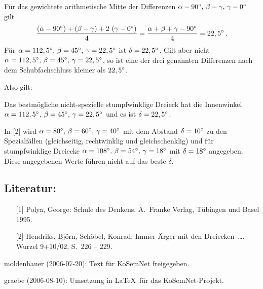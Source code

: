 \documentclass[10pt]{article}
\begin{document}
Für das gewichtete arithmetische Mitte der Differenzen $\alpha-90^{\circ},\,
\beta-\gamma,\, \gamma-0^{\circ}$ gilt
\begin{gather*}
  \frac{\left(\alpha-90^{\circ}\right)+\left(\beta-\gamma\right)+2\,\left(\gamma-0^{\circ}\right)}{4} =
  \frac{\alpha+\beta+\gamma-90^{\circ}}{4}=22,5^{\circ}\,. 
\end{gather*}
Für $\alpha=112,5^{\circ},\, \beta=45^{\circ},\, \gamma=22,5^{\circ}$ ist
$\delta=22,5^{\circ}$.  Gilt aber nicht $\alpha=112,5^{\circ},\, \beta=45^{\circ},\,
\gamma=22,5^{\circ}$, so ist eine der drei genannten Differenzen nach dem
Schubfachschluss kleiner als $22,5^{\circ}$.

Also gilt:
\begin{satz}
  Das bestmögliche nicht-spezielle stumpfwinklige Dreieck hat die Innenwinkel
  $\alpha=112,5^{\circ}$, $\beta=45^{\circ},\, \gamma=22,5^{\circ}$ und es ist
  $\delta=22,5^{\circ}$.
\end{satz}

In [2] wird $\alpha=80^{\circ},\, \beta=60^{\circ},\, \gamma=40^{\circ}$ mit dem
Abstand $\delta=10^{\circ}$ zu den Spezialfällen (gleichseitig, rechtwinklig und
gleichschenklig) und für stumpfwinklige Dreiecke $\alpha=108^{\circ},\,
\beta=54^{\circ},\, \gamma=18^{\circ}$ mit $\delta=18^{\circ}$ angegeben. Diese
angegebenen Werte führen nicht auf das beste $\delta$.

\subsection*{Literatur:}
\begin{itemize}
\item[{[1]}] Polya, George: Schule des Denkens. A.~Franke Verlag, Tübingen und
  Basel 1995.
\item[{[2]}] Hendriks, Björn, Schöbel, Konrad: Immer Ärger mit den Dreiecken\
  \ldots. Wurzel 9+10/02, S.~226 -- 229. 
\end{itemize}


\begin{attribution}
moldenhauer (2006-07-20): Text für KoSemNet freigegeben. 

graebe (2006-08-10): Umsetzung in \LaTeX\ für das KoSemNet-Projekt.
\end{attribution}
\end{document}
